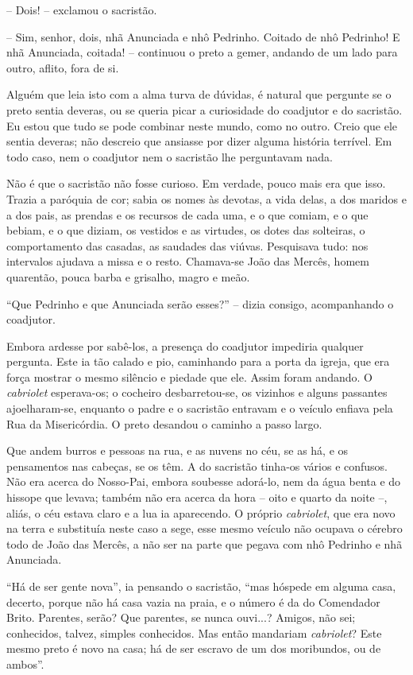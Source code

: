 -- Dois! -- exclamou o sacristão.

-- Sim, senhor, dois, nhã Anunciada e nhô Pedrinho. Coitado de nhô
Pedrinho! E nhã Anunciada, coitada! -- continuou o preto a gemer,
andando de um lado para outro, aflito, fora de si.

Alguém que leia isto com a alma turva de dúvidas, é natural que pergunte
se o preto sentia deveras, ou se queria picar a curiosidade do coadjutor
e do sacristão. Eu estou que tudo se pode combinar neste mundo, como no
outro. Creio que ele sentia deveras; não descreio que ansiasse por dizer
alguma história terrível. Em todo caso, nem o coadjutor nem o sacristão
lhe perguntavam nada.

Não é que o sacristão não fosse curioso. Em verdade, pouco mais era que
isso. Trazia a paróquia de cor; sabia os nomes às devotas, a vida delas,
a dos maridos e a dos pais, as prendas e os recursos de cada uma, e o
que comiam, e o que bebiam, e o que diziam, os vestidos e as virtudes,
os dotes das solteiras, o comportamento das casadas, as saudades das
viúvas. Pesquisava tudo: nos intervalos ajudava a missa e o resto.
Chamava-se João das Mercês, homem quarentão, pouca barba e grisalho,
magro e meão.

``Que Pedrinho e que Anunciada serão esses?'' -- dizia consigo,
acompanhando o coadjutor.

Embora ardesse por sabê-los, a presença do coadjutor impediria qualquer
pergunta. Este ia tão calado e pio, caminhando para a porta da igreja,
que era força mostrar o mesmo silêncio e piedade que ele. Assim foram
andando. O \emph{cabriolet} esperava-os; o cocheiro desbarretou-se, os
vizinhos e alguns passantes ajoelharam-se, enquanto o padre e o
sacristão entravam e o veículo enfiava pela Rua da Misericórdia. O preto
desandou o caminho a passo largo.

Que andem burros e pessoas na rua, e as nuvens no céu, se as há, e os
pensamentos nas cabeças, se os têm. A do sacristão tinha-os vários e
confusos. Não era acerca do Nosso-Pai, embora soubesse adorá-lo, nem da
água benta e do hissope que levava; também não era acerca da hora --
oito e quarto da noite --, aliás, o céu estava claro e a lua ia
aparecendo. O próprio \emph{cabriolet}, que era novo na terra e
substituía neste caso a sege, esse mesmo veículo não ocupava o cérebro
todo de João das Mercês, a não ser na parte que pegava com nhô Pedrinho
e nhã Anunciada.

``Há de ser gente nova'', ia pensando o sacristão, ``mas hóspede em
alguma casa, decerto, porque não há casa vazia na praia, e o número é da
do Comendador Brito. Parentes, serão? Que parentes, se nunca ouvi...?
Amigos, não sei; conhecidos, talvez, simples conhecidos. Mas então
mandariam \emph{cabriolet}? Este mesmo preto é novo na casa; há de ser
escravo de um dos moribundos, ou de ambos''.

